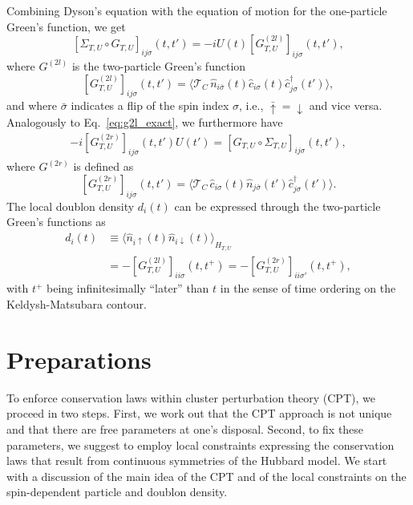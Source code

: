 \documentclass[twocolumn,prb,showpacs,aps,superscriptaddress]{revtex4}
\newcommand{\cd}[1]{\ensuremath{\hat{c}^\dagger_{#1}}}
\newcommand{\cc}[1]{\ensuremath{\hat{c}_{#1}}}
\newcommand{\est}[1]{\ensuremath{\langle {#1} \rangle}}
\newcommand{\dt}[0]{\ensuremath{\mathrm{d}t}}
\begin{document}
Combining Dyson's equation with the equation of motion for the one-particle
Green's function, we get
\begin{equation}
  \label{eq:g2l_def}
  [\Sigma_{T,U} \circ G_{T,U}]_{ij\sigma}(t,t')
  = -i U(t) [G_{T,U}^{(2l)}]_{ij\sigma}(t,t'),
\end{equation}
where $G^{(2l)}$ is the two-particle Green's function
\begin{equation}
  \label{eq:g2l_exact}
  [G_{T,U}^{(2l)}]_{ij\sigma}(t,t') 
  = 
  \est
  {
    \mathcal{T}_C\,\hat{n}_{i\bar\sigma}(t)\cc{i\sigma}(t)\cd{j\sigma}(t')
  } , 
\end{equation}
and where $\bar\sigma$ indicates a flip of the spin index $\sigma$, i.e.,
$\bar \uparrow = \downarrow$ and vice versa.  Analogously to Eq.\
\eqref{eq:g2l_exact}, we furthermore have 
\begin{align}        
  \label{eq:g2r_def}
  -i [G^{(2r)}_{T,U}]_{ij\sigma}(t,t') U(t')
  =
  [G_{T,U} \circ \Sigma_{T,U}]_{ij\sigma}(t,t'),
\end{align}
where $G^{(2r)}$ is defined as
\begin{equation}
  \label{eq:g2r_exact}
  [G_{T,U}^{(2r)}]_{ij\sigma}(t,t') 
  = 
  \est
  {
    \mathcal{T}_C\,\cc{i\sigma}(t)\hat{n}_{j\bar\sigma}(t')\cd{j\sigma}(t')
  }.
\end{equation}
The local doublon density $d_i(t)$ can be expressed through the two-particle
Green's functions as 
\begin{align}
  \label{eq:d_is_independent}
  d_i(t) 
  &\equiv
  \est{\hat{n}_{i\uparrow}(t)\hat{n}_{i\downarrow}(t)}_{H_{T,U}}\\
  &= 
  -[G^{(2l)}_{T,U}]_{ii\sigma}(t,t^+) 
  = 
  -[G^{(2r)}_{T,U}]_{ii\sigma'}(t,t^+),\nonumber
\end{align}
with $t^+$ being infinitesimally ``later'' than $t$ in the sense of time
ordering on the Keldysh-Matsubara contour.


\section{Preparations}
\label{sec:prep}

To enforce conservation laws within cluster perturbation theory (CPT), we proceed in two steps.  
First, we work out that the CPT approach is not unique and that there are free parameters at one's disposal.  
Second, to fix these parameters, we suggest to employ local constraints expressing the conservation laws that result from continuous symmetries of the Hubbard model.  
We start with a discussion of the main idea of the CPT and of the local constraints on the spin-dependent particle and doublon density.
\end{document}
